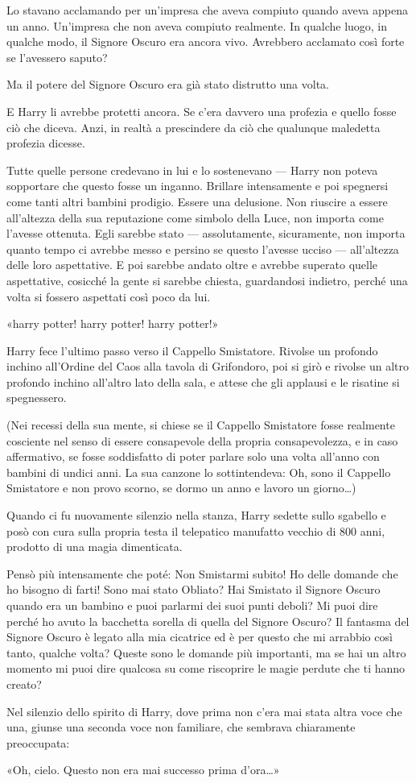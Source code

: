 Lo stavano acclamando per un’impresa che aveva compiuto quando aveva appena un anno. Un’impresa che non aveva compiuto realmente. In qualche luogo, in qualche modo, il Signore Oscuro era ancora vivo. Avrebbero acclamato così forte se l’avessero saputo?

Ma il potere del Signore Oscuro era già stato distrutto una volta.

E Harry li avrebbe protetti ancora. Se c’era davvero una profezia e quello fosse ciò che diceva. Anzi, in realtà a prescindere da ciò che qualunque maledetta profezia dicesse.

Tutte quelle persone credevano in lui e lo sostenevano — Harry non poteva sopportare che questo fosse un inganno. Brillare intensamente e poi spegnersi come tanti altri bambini prodigio. Essere una delusione. Non riuscire a essere all’altezza della sua reputazione come simbolo della Luce, non importa come l’avesse ottenuta. Egli sarebbe stato — assolutamente, sicuramente, non importa quanto tempo ci avrebbe messo e persino se questo l’avesse ucciso — all’altezza delle loro aspettative. E poi sarebbe andato oltre e avrebbe superato quelle aspettative, cosicché la gente si sarebbe chiesta, guardandosi indietro, perché una volta si fossero aspettati così poco da lui.

«harry potter! harry potter! harry potter!»

Harry fece l’ultimo passo verso il Cappello Smistatore. Rivolse un profondo inchino all’Ordine del Caos alla tavola di Grifondoro, poi si girò e rivolse un altro profondo inchino all’altro lato della sala, e attese che gli applausi e le risatine si spegnessero.

(Nei recessi della sua mente, si chiese se il Cappello Smistatore fosse realmente cosciente nel senso di essere consapevole della propria consapevolezza, e in caso affermativo, se fosse soddisfatto di poter parlare solo una volta all’anno con bambini di undici anni. La sua canzone lo sottintendeva: Oh, sono il Cappello Smistatore e non provo scorno, se dormo un anno e lavoro un giorno…)

Quando ci fu nuovamente silenzio nella stanza, Harry sedette sullo sgabello e posò con cura sulla propria testa il telepatico manufatto vecchio di 800 anni, prodotto di una magia dimenticata.

Pensò più intensamente che poté: Non Smistarmi subito! Ho delle domande che ho bisogno di farti! Sono mai stato Obliato? Hai Smistato il Signore Oscuro quando era un bambino e puoi parlarmi dei suoi punti deboli? Mi puoi dire perché ho avuto la bacchetta sorella di quella del Signore Oscuro? Il fantasma del Signore Oscuro è legato alla mia cicatrice ed è per questo che mi arrabbio così tanto, qualche volta? Queste sono le domande più importanti, ma se hai un altro momento mi puoi dire qualcosa su come riscoprire le magie perdute che ti hanno creato?

Nel silenzio dello spirito di Harry, dove prima non c’era mai stata altra voce che una, giunse una seconda voce non familiare, che sembrava chiaramente preoccupata:

«Oh, cielo. Questo non era mai successo prima d’ora…»



